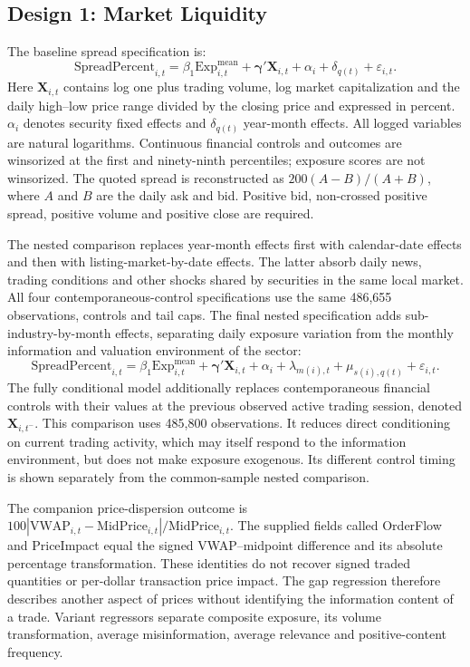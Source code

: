 \documentclass{article}
\theoremstyle{plain}
\begin{document}
\subsection{Design 1: Market Liquidity}
The baseline spread specification is:
\begin{equation}
\text{SpreadPercent}_{i,t}=\beta_1\mathrm{Exp}^{\mathrm{mean}}_{i,t}+\boldsymbol\gamma'\mathbf X_{i,t}+\alpha_i+\delta_{q(t)}+\varepsilon_{i,t}.
\label{eq:spread_reg}
\end{equation}
Here $\mathbf X_{i,t}$ contains log one plus trading volume, log market capitalization and the daily high--low price range divided by the closing price and expressed in percent. $\alpha_i$ denotes security fixed effects and $\delta_{q(t)}$ year-month effects. All logged variables are natural logarithms. Continuous financial controls and outcomes are winsorized at the first and ninety-ninth percentiles; exposure scores are not winsorized. The quoted spread is reconstructed as $200(A-B)/(A+B)$, where $A$ and $B$ are the daily ask and bid. Positive bid, non-crossed positive spread, positive volume and positive close are required.

The nested comparison replaces year-month effects first with calendar-date effects and then with listing-market-by-date effects. The latter absorb daily news, trading conditions and other shocks shared by securities in the same local market. All four contemporaneous-control specifications use the same 486,655 observations, controls and tail caps. The final nested specification adds sub-industry-by-month effects, separating daily exposure variation from the monthly information and valuation environment of the sector:
\begin{equation}
\text{SpreadPercent}_{i,t}=\beta_1\mathrm{Exp}^{\mathrm{mean}}_{i,t}+\boldsymbol\gamma'\mathbf X_{i,t}+\alpha_i+\lambda_{m(i),t}+\mu_{s(i),q(t)}+\varepsilon_{i,t}.
\label{eq:saturated}
\end{equation}
The fully conditional model additionally replaces contemporaneous financial controls with their values at the previous observed active trading session, denoted $\mathbf X_{i,t^-}$. This comparison uses 485,800 observations. It reduces direct conditioning on current trading activity, which may itself respond to the information environment, but does not make exposure exogenous. Its different control timing is shown separately from the common-sample nested comparison.

The companion price-dispersion outcome is $100|\mathrm{VWAP}_{i,t}-\mathrm{MidPrice}_{i,t}|/\mathrm{MidPrice}_{i,t}$. The supplied fields called OrderFlow and PriceImpact equal the signed VWAP--midpoint difference and its absolute percentage transformation. These identities do not recover signed traded quantities or per-dollar transaction price impact. The gap regression therefore describes another aspect of prices without identifying the information content of a trade. Variant regressors separate composite exposure, its volume transformation, average misinformation, average relevance and positive-content frequency.
\end{document}

